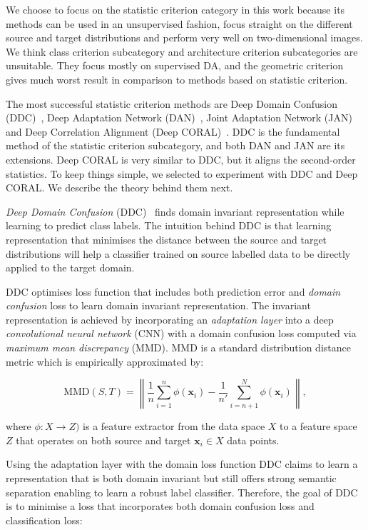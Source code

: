We choose to focus on the statistic criterion category in this work
because its methods can be used in an unsupervised fashion,
focus straight on the different source and target distributions
and perform very well on two-dimensional images.
We think class criterion subcategory and architecture criterion subcategories are unsuitable.
They focus mostly on supervised DA, and the geometric criterion gives much worst result in comparison to methods based on statistic criterion.

The most successful statistic criterion methods are Deep Domain Confusion (DDC)~\cite{tzeng2014}, Deep Adaptation Network (DAN)~\cite{long2015}, Joint Adaptation Network (JAN)~\cite{long2017} and Deep Correlation Alignment (Deep CORAL)~\cite{sun2016}.
DDC is the fundamental method of the statistic criterion subcategory,
and both DAN and JAN are its extensions.
Deep CORAL is very similar to DDC, but it aligns the second-order statistics.
To keep things simple, we selected to experiment with DDC and Deep CORAL.
We describe the theory behind them next.

\textit{Deep Domain Confusion} (DDC)~\cite{tzeng2014} finds domain invariant representation
while learning to predict class labels.
The intuition behind DDC is that learning representation
that minimises the distance between the source and target distributions
will help a classifier trained on source labelled data
to be directly applied to the target domain.

DDC optimises loss function that includes both prediction error and \textit{domain confusion} loss to learn domain invariant representation.
The invariant representation is achieved by incorporating an \textit{adaptation layer} into a deep \textit{convolutional neural network} (CNN)
with a domain confusion loss computed via \textit{maximum mean discrepancy} (MMD).
MMD is a standard distribution distance metric which is empirically approximated by:

\begin{equation}
	\mathrm{MMD}(S, T) = \left\|
	\frac{1}{n} \sum_{i = 1}^{n} \phi(\mathbf{x}_i) -
	\frac{1}{n'} \sum_{i = n + 1}^{N} \phi(\mathbf{x}_i)
	\right\|,
	\label{maximam_mean_discrepancy}
\end{equation}

where \(\phi: X \to Z)\) is a feature extractor
from the data space \(X\) to a feature space \(Z\)
that operates on both source and target \(\mathbf{x}_i \in X\) data points.

Using the adaptation layer with the domain loss function DDC claims to learn a representation
that is both domain invariant but still offers strong semantic separation enabling to learn a robust label classifier.
Therefore, the goal of DDC is to minimise a loss that incorporates both domain confusion loss and classification loss:

